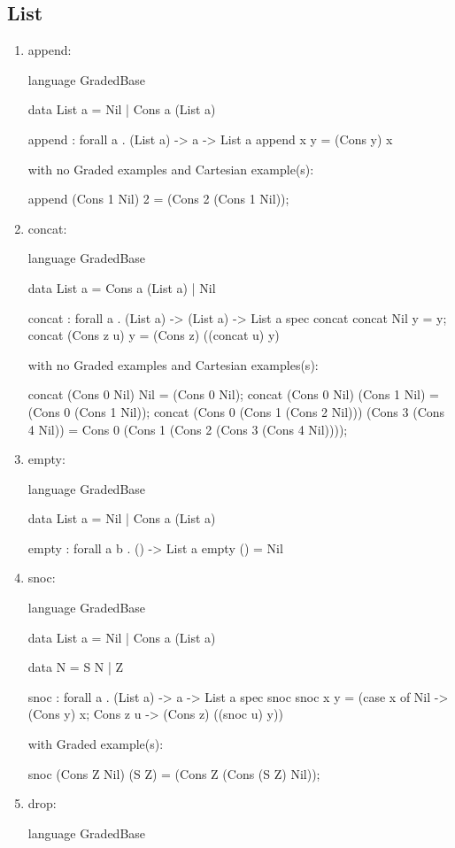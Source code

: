 \subsection{List}
\begin{enumerate}
\item append: 
\begin{granule}
language GradedBase

data List a = Nil | Cons a (List a)
    
append : forall a 
       . (List a) %
       -> a %
       -> List a
append x y = (Cons y) x
\end{granule}
with no Graded examples and Cartesian example(s):
\begin{granule}
append (Cons 1 Nil) 2 = (Cons 2 (Cons 1 Nil));
\end{granule}
\item concat:
\begin{granule}
language GradedBase 

data List a = Cons a (List a) | Nil
    
concat : forall a 
       . (List a) %
       -> (List a) %
       ->  List a
spec 
    concat %
concat Nil y = y;
concat (Cons z u) y = (Cons z) ((concat u) y)
\end{granule}
with no Graded examples and Cartesian examples(s):
\begin{granule}
concat (Cons 0 Nil) Nil = (Cons 0 Nil);                                                                        
concat (Cons 0 Nil) (Cons 1 Nil) = (Cons 0 (Cons 1 Nil));                                                       
concat (Cons 0 (Cons 1 (Cons 2 Nil))) (Cons 3 (Cons 4 Nil)) = Cons 0 (Cons 1 (Cons 2 (Cons 3 (Cons 4 Nil))));
\end{granule}
\item empty: 
\begin{granule}
language GradedBase

data List a = Nil | Cons a (List a) 

empty : forall a b . () -> List a
empty () = Nil
\end{granule}
\item snoc: 
\begin{granule}
language GradedBase

data List a = Nil | Cons a (List a)

data N = S N | Z

snoc : forall a 
     . (List a) %
     -> a %
     -> List a
spec 
    snoc %
snoc x y = 
    (case x of
      Nil -> (Cons y) x;
      Cons z u -> (Cons z) ((snoc u) y))
\end{granule}
with Graded example(s):
\begin{granule}
snoc (Cons Z Nil) (S Z) = (Cons Z (Cons (S Z) Nil));
\end{granule}
\item drop: 
\begin{granule}
language GradedBase


\end{granule}
\end{enumerate}
